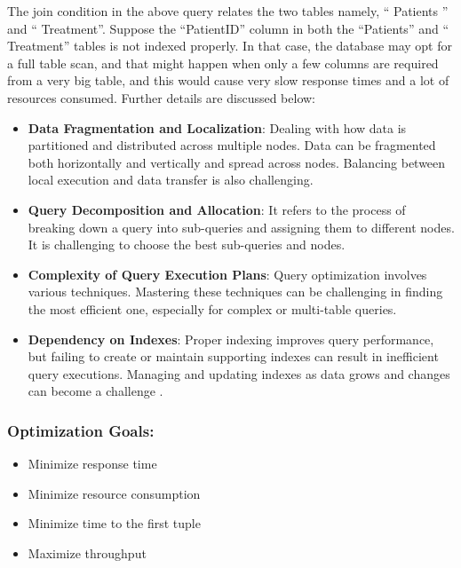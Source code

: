 

The join condition in the above query relates the two tables namely, `` Patients '' and `` Treatment''. Suppose the ``PatientID'' column in both the ``Patients'' and `` Treatment'' tables is not indexed properly. In that case, the database may opt for a full table scan, and that might happen when only a few columns are required from a very big table, and this would cause very slow response times and a lot of resources consumed. Further details are discussed below:

\begin{itemize}
    \item\textbf{Data Fragmentation and Localization}: Dealing with how data is partitioned and distributed across multiple nodes. Data can be fragmented both horizontally and vertically and spread across nodes. Balancing between local execution and data transfer is also challenging. 
    \item\textbf{Query Decomposition and Allocation}: It refers to the process of breaking down a query into sub-queries and assigning them to different nodes. It is challenging to choose the best sub-queries and nodes.
    \item\textbf{Complexity of Query Execution Plans}: Query optimization involves various techniques. Mastering these techniques can be challenging in finding the most efficient one, especially for complex or multi-table queries.
    \item\textbf{Dependency on Indexes}: Proper indexing improves query performance, but failing to create or maintain supporting indexes can result in inefficient query executions. Managing and updating indexes as data grows and changes can become a challenge \cite{team-2020,etutorials-03-2024,editor-ijmter-2015}.
\end{itemize}
\subsubsection*{Optimization Goals:}

\begin{itemize}
    \item Minimize response time
    \item Minimize resource consumption
    \item Minimize time to the first tuple
    \item Maximize throughput
\end{itemize}\vspace{.4cm}

